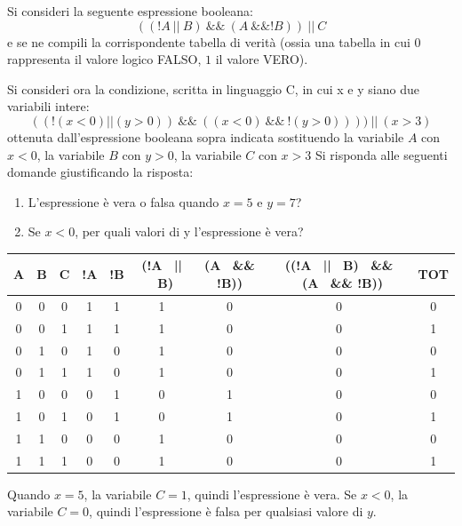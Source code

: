 \begin{Exercise}[label={ex:espr_logica}]
Si consideri la seguente espressione booleana:
$$((!A \ || \ B) \ \&\& \ (A \  \&\& !B))\ || \ C$$
e se ne compili la corrispondente tabella di verit\`a (ossia una tabella in cui $0$ rappresenta il valore logico FALSO, $1$ il valore VERO).

Si consideri ora la condizione, scritta in linguaggio C, in cui x e y siano due variabili intere:
$$((!(x < 0) || (y>0)) \ \&\& \ ((x < 0) \ \&\& \ !(y > 0))) ) \ || \ (x > 3)$$
ottenuta dall'espressione booleana sopra indicata sostituendo la variabile $A$ con $x < 0$, la variabile $B$ con $y > 0$, la variabile $C$ con $x > 3$
Si risponda alle seguenti domande giustificando la risposta:
\begin{enumerate}
	\item L'espressione \`e vera o falsa quando $x = 5$ e $y = 7$?
	\item Se $x < 0$, per quali valori di y l'espressione \`e vera?
\end{enumerate}
\end{Exercise}

\begin{Answer}[ref={ex:espr_logica}]
\begin{tabular}{|c|c|c|c|c|c|c|c|c|}
\hline
A & B & C & !A & !B & (!A \ || \ B) & (A \  \&\& !B)) & ((!A \ || \ B) \ \&\& \ (A \  \&\& !B)) & TOT\\
\hline
0 & 0 & 0 & 1 & 1 & 1 & 0 & 0 & 0\\
\hline
0 & 0 & 1 & 1 & 1 & 1 & 0 & 0 & 1\\
\hline
0 & 1 & 0 & 1 & 0 & 1 & 0 & 0 & 0\\
\hline
0 & 1 & 1 & 1 & 0 & 1 & 0 & 0 & 1\\
\hline
1 & 0 & 0 & 0 & 1 & 0 & 1 & 0 & 0\\
\hline
1 & 0 & 1 & 0 & 1 & 0 & 1 & 0 & 1\\
\hline
1 & 1 & 0 & 0 & 0 & 1 & 0 & 0 & 0\\
\hline
1 & 1 & 1 & 0 & 0 & 1 & 0 & 0 & 1\\
\hline
\end{tabular}

Quando $x = 5$, la variabile $C = 1$, quindi l'espressione \`e vera. Se $x < 0$, la variabile $C = 0$, quindi l'espressione \`e falsa per qualsiasi valore di $y$.
\end{Answer}